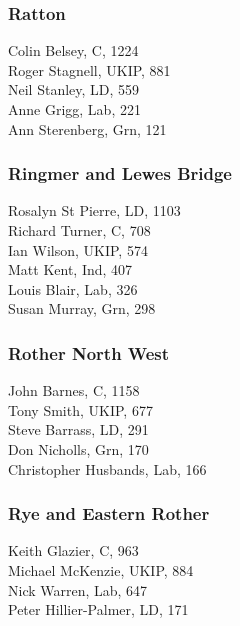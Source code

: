 \documentclass[a4paper,openany,10pt]{book}
\begin{document}
\subsubsection*{Ratton}



Colin Belsey, C, 1224\\
Roger Stagnell, UKIP, 881\\
Neil Stanley, LD, 559\\
Anne Grigg, Lab, 221\\
Ann Sterenberg, Grn, 121\\


\subsubsection*{Ringmer and Lewes Bridge}



Rosalyn St Pierre, LD, 1103\\
Richard Turner, C, 708\\
Ian Wilson, UKIP, 574\\
Matt Kent, Ind, 407\\
Louis Blair, Lab, 326\\
Susan Murray, Grn, 298\\


\subsubsection*{Rother North West}



John Barnes, C, 1158\\
Tony Smith, UKIP, 677\\
Steve Barrass, LD, 291\\
Don Nicholls, Grn, 170\\
{Christopher Husbands}, Lab, 166\\


\subsubsection*{Rye and Eastern Rother}



Keith Glazier, C, 963\\
Michael McKenzie, UKIP, 884\\
Nick Warren, Lab, 647\\
Peter Hillier-Palmer, LD, 171\\
\end{document}
